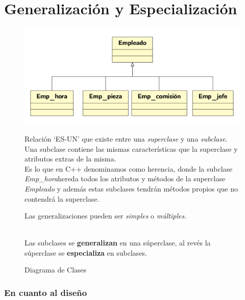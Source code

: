 \chapter{Generalización y Especialización}
\begin{figure}[h]
  \begin{minipage}{0.5\textwidth}
    \includegraphics[width=\textwidth]{Imagenes/gen1.png}
    \caption{Diagrama de Clases}
  \end{minipage}
  \begin{minipage}{0.5\textwidth}
      \vspace{-1\baselineskip} %
Relación ‘ES-UN’ que existe entre una \textit{superclase} y una \textit{subclase}.\\

Una subclase contiene las mismas características que la superclase y atributos extras de la misma.\\

Es lo que en C++ denominamos como herencia, donde la subclase \textit{Emp\_hora}hereda todos los atributos y métodos de la superclase \textit{Empleado} y además estas subclases tendrán métodos propios que no contendrá la superclase.

Las generalizaciones pueden ser \textit{simples} o \textit{múltiples.}
  \end{minipage}
\\

Las subclases se \textbf{generalizan} en una súperclase, al revés la súperclase se \textbf{especializa} en subclases.
\end{figure}
\subsection{En cuanto al diseño}

